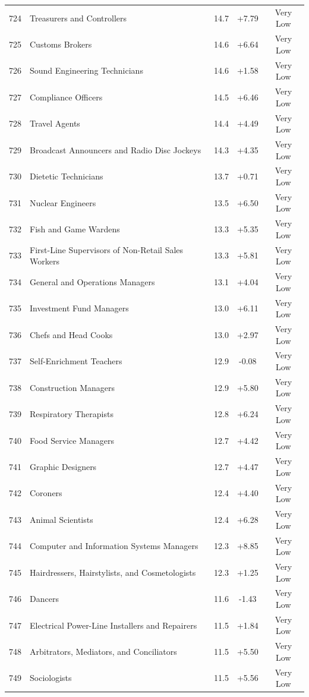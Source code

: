 {\begin{longtable}{rp{7cm}ccc}
724 & Treasurers and Controllers & 14.7 & +7.79 & Very Low \\
725 & Customs Brokers & 14.6 & +6.64 & Very Low \\
726 & Sound Engineering Technicians & 14.6 & +1.58 & Very Low \\
727 & Compliance Officers & 14.5 & +6.46 & Very Low \\
728 & Travel Agents & 14.4 & +4.49 & Very Low \\
729 & Broadcast Announcers and Radio Disc Jockeys & 14.3 & +4.35 & Very Low \\
730 & Dietetic Technicians & 13.7 & +0.71 & Very Low \\
731 & Nuclear Engineers & 13.5 & +6.50 & Very Low \\
732 & Fish and Game Wardens & 13.3 & +5.35 & Very Low \\
733 & First-Line Supervisors of Non-Retail Sales Workers & 13.3 & +5.81 & Very Low \\
734 & General and Operations Managers & 13.1 & +4.04 & Very Low \\
735 & Investment Fund Managers & 13.0 & +6.11 & Very Low \\
736 & Chefs and Head Cooks & 13.0 & +2.97 & Very Low \\
737 & Self-Enrichment Teachers & 12.9 & -0.08 & Very Low \\
738 & Construction Managers & 12.9 & +5.80 & Very Low \\
739 & Respiratory Therapists & 12.8 & +6.24 & Very Low \\
740 & Food Service Managers & 12.7 & +4.42 & Very Low \\
741 & Graphic Designers & 12.7 & +4.47 & Very Low \\
742 & Coroners & 12.4 & +4.40 & Very Low \\
743 & Animal Scientists & 12.4 & +6.28 & Very Low \\
744 & Computer and Information Systems Managers & 12.3 & +8.85 & Very Low \\
745 & Hairdressers, Hairstylists, and Cosmetologists & 12.3 & +1.25 & Very Low \\
746 & Dancers & 11.6 & -1.43 & Very Low \\
747 & Electrical Power-Line Installers and Repairers & 11.5 & +1.84 & Very Low \\
748 & Arbitrators, Mediators, and Conciliators & 11.5 & +5.50 & Very Low \\
749 & Sociologists & 11.5 & +5.56 & Very Low \\

\end{longtable}}
